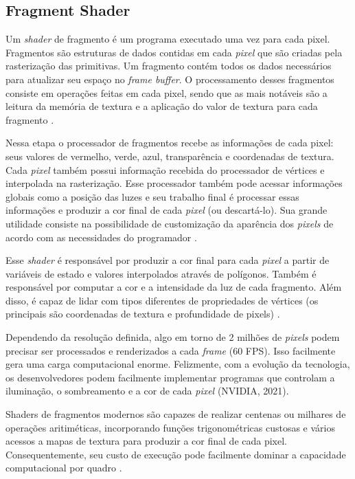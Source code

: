 \subsection{Fragment Shader}
\label{sec:fragment-shader}

Um \textit{shader} de fragmento é um programa executado uma vez para cada pixel. Fragmentos são estruturas de dados contidas em cada \textit{pixel} que são criadas pela rasterização das primitivas. Um fragmento contém todos os dados necessários para atualizar seu espaço no \textit{frame buffer}. O processamento desses fragmentos consiste em operações feitas em cada pixel, sendo que as mais notáveis são a leitura da memória de textura e a aplicação do valor de textura para cada fragmento \cite{GLSLBook}. 

Nessa etapa o processador de fragmentos recebe as informações de cada pixel: seus valores de vermelho, verde, azul, transparência e coordenadas de textura. Cada \textit{pixel} também possui informação recebida do processador de vértices e interpolada na rasterização. Esse processador também pode acessar informações globais como a posição das luzes e seu trabalho final é processar essas informações e produzir a cor final de cada \textit{pixel} (ou descartá-lo). Sua grande utilidade consiste na possibilidade de customização da aparência dos \textit{pixels} de acordo com as necessidades do programador \cite{bailey2007}. 

Esse \textit{shader} é responsável por produzir a cor final para cada \textit{pixel} a partir de variáveis de estado e valores interpolados através de polígonos. Também é responsável por computar a cor e a intensidade da luz de cada fragmento. Além disso, é capaz de lidar com tipos diferentes de propriedades de vértices (os principais são coordenadas de textura e profundidade de pixels) \cite{hasu2018modern}. 

Dependendo da resolução definida, algo em torno de 2 milhões de \textit{pixels} podem precisar ser processados e renderizados a cada \textit{frame} (60 FPS). Isso facilmente gera uma carga computacional enorme. Felizmente, com a evolução da tecnologia, os desenvolvedores podem facilmente implementar programas que controlam a iluminação, o sombreamento e a cor de cada \textit{pixel} (NVIDIA, 2021)\nocite{fragShader}.

Shaders de fragmentos modernos são capazes de realizar centenas ou milhares de operações aritiméticas, incorporando funções trigonométricas custosas e vários acessos a mapas de textura para produzir a cor final de cada pixel. Consequentemente, seu custo de execução pode facilmente dominar a capacidade computacional por quadro \cite{lei2008acm}.

